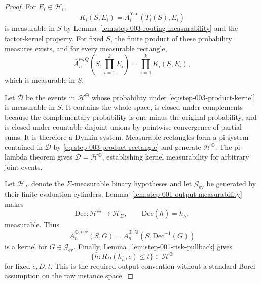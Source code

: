 \begin{proof}
For \(E_i\in\mathscr H_i\),
\begin{equation}\label{eq:step-003-routed-coordinate-kernel}
K_i(S,E_i)=\bar A_i^{\mathrm{Yan}}(\bar T_i(S),E_i)
\end{equation}
is measurable in \(S\) by Lemma~\ref{lem:step-003-routing-measurability}
and the factor-kernel property.  For fixed \(S\), the finite product of
these probability measures exists, and for every measurable rectangle,
\begin{equation}\label{eq:step-003-product-rectangle}
\bar A_n^{\oplus,Q}\!\left(S,\prod_{i=1}^kE_i\right)
=\prod_{i=1}^kK_i(S,E_i),
\end{equation}
which is measurable in \(S\).

Let \(\mathcal D\) be the events in \(\mathscr H^{\oplus}\) whose
probability under \eqref{eq:step-003-product-kernel} is measurable in
\(S\).  It contains the whole space, is closed under complements because
the complementary probability is one minus the original probability, and
is closed under countable disjoint unions by pointwise convergence of
partial sums.  It is therefore a Dynkin system.  Measurable rectangles form
a pi-system contained in \(\mathcal D\) by
\eqref{eq:step-003-product-rectangle} and generate
\(\mathscr H^{\oplus}\).  The pi-lambda theorem gives
\(\mathcal D=\mathscr H^{\oplus}\), establishing kernel measurability for
arbitrary joint events.

Let \(\mathcal H_\Sigma\) denote the \(\Sigma\)-measurable binary
hypotheses and let \(\mathscr G_{\mathrm{ev}}\) be generated by their finite
evaluation cylinders.  Lemma~\ref{lem:step-001-output-measurability} makes
\[
\mathrm{Dec}:\mathcal H^{\oplus}\to\mathcal H_\Sigma,
\qquad \mathrm{Dec}(\bar h)=h_{\bar h},
\]
measurable.  Thus
\begin{equation}\label{eq:step-003-decoded-kernel}
\bar A_n^{\oplus,\mathrm{dec}}(S,G)
=\bar A_n^{\oplus,Q}(S,\mathrm{Dec}^{-1}(G))
\end{equation}
is a kernel for \(G\in\mathscr G_{\mathrm{ev}}\).  Finally,
Lemma~\ref{lem:step-001-risk-pullback} gives
\begin{equation}\label{eq:step-003-risk-event}
\{\bar h:R_D(h_{\bar h},c)\le t\}\in\mathscr H^{\oplus}
\end{equation}
for fixed \(c,D,t\).  This is the required output convention without a
standard-Borel assumption on the raw instance space.
\end{proof}


